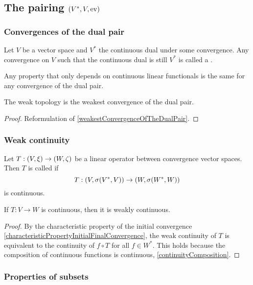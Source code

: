 \subsection{The pairing $\left( V^*, V, \operatorname{ev} \right)$}
\subsubsection{Convergences of the dual pair}
\begin{definition}
Let $V$ be a vector space and $V^*$ the continuous dual under some convergence. Any convergence on $V$ such that the continuous dual is still $V^*$ is called a .
\end{definition}
Any property that only depends on continuous linear functionals is the same for any convergence of the dual pair.

\begin{proposition}
The weak topology is the weakest convergence of the dual pair.
\end{proposition}
\begin{proof}
Reformulation of \ref{weakestConvergenceOfTheDualPair}.
\end{proof}

\subsubsection{Weak continuity}
\begin{definition}
Let $T: \left( V,\xi \right) \to \left( W,\zeta \right)$ be a linear operator between convergence vector spaces. Then $T$ is called  if
\[ T: \left( V, \sigma(V^*,V) \right) \to \left( W, \sigma(W^*,W) \right) \]
is continuous.
\end{definition}

\begin{lemma}
If $T: V\to W$ is continuous, then it is weakly continuous.
\end{lemma}
\begin{proof}
By the characteristic property of the initial convergence \ref{characteristicPropertyInitialFinalConvergence}, the weak continuity of $T$ is equivalent to the continuity of $f\circ T$ for all $f\in W^*$. This holds because the composition of continuous functions is continuous, \ref{continuityComposition}.
\end{proof}

\subsubsection{Properties of subsets}

